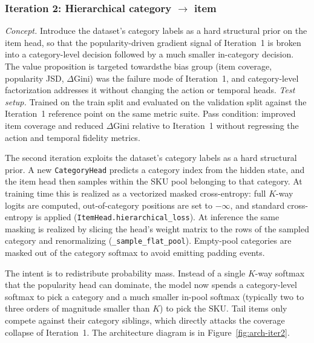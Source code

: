 \documentclass[sigconf,nonacm]{acmart}
\begin{document}
\subsubsection{Iteration 2: Hierarchical category $\rightarrow$ item}
\label{sec:iter2-hier}
\textit{Concept.} Introduce the dataset's category labels as a hard
structural prior on the item head, so that the popularity-driven
gradient signal of Iteration~1 is broken into a category-level decision
followed by a much smaller in-category decision. The value proposition
is targeted towardsthe bias group (item coverage, popularity JSD,
$\Delta$Gini) was the failure mode of Iteration~1, and category-level
factorization addresses it without changing the action or
temporal heads.
\textit{Test setup.} Trained on the train split and evaluated on the
validation split against the Iteration~1 reference point on the same
metric suite. Pass condition: improved item coverage and reduced
$\Delta$Gini relative to Iteration~1 without regressing the action and
temporal fidelity metrics.

The second iteration exploits the dataset's category labels as a hard
structural prior. A new \texttt{CategoryHead} predicts a category index
from the hidden state, and the item head then samples within the SKU pool
belonging to that category. At training time this is realized as a
vectorized masked cross-entropy: full $K$-way logits are computed,
out-of-category positions are set to $-\infty$, and standard cross-entropy
is applied (\texttt{ItemHead.hierarchical\_loss}). At inference the same
masking is realized by slicing the head's weight matrix to the rows of the
sampled category and renormalizing (\texttt{\_sample\_flat\_pool}).
Empty-pool categories are masked out of the category softmax to avoid
emitting padding events.

The intent is to redistribute probability mass. Instead of a single
$K$-way softmax that the popularity head can dominate, the model now spends
a category-level softmax to pick a category and a much smaller in-pool
softmax (typically two to three orders of magnitude smaller than $K$) to
pick the SKU. Tail items only compete against their category siblings,
which directly attacks the coverage collapse of Iteration~1. The
architecture diagram is in Figure~\ref{fig:arch-iter2}.
\end{document}
